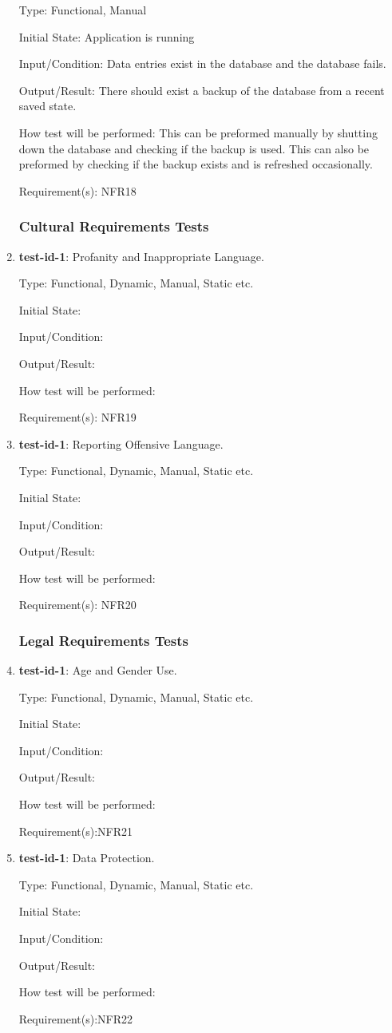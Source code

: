\documentclass[12pt, titlepage]{article}
\begin{document}
\begin{enumerate}
		Type: Functional, Manual
		
		Initial State: Application is running
		
		Input/Condition: Data entries exist in the database and the database fails.
		
		Output/Result: There should exist a backup of the database from a recent saved state.
		
		How test will be performed: This can be preformed manually by shutting down the database and checking if the backup is used. This can also be preformed by checking if the backup exists and is refreshed occasionally.
		
		Requirement(s): NFR18
	\subsubsection{Cultural Requirements Tests}
		\item{\textbf{test-id-1}}: Profanity and Inappropriate Language.
		
		Type: Functional, Dynamic, Manual, Static etc.
		
		Initial State: 
		
		Input/Condition: 
		
		Output/Result: 
		
		How test will be performed: 
		
		Requirement(s): NFR19
		
		\item{\textbf{test-id-1}}: Reporting Offensive Language.
		
		Type: Functional, Dynamic, Manual, Static etc.
		
		Initial State: 
		
		Input/Condition: 
		
		Output/Result: 
		
		How test will be performed: 
		
		Requirement(s): NFR20
	\subsubsection{Legal Requirements Tests}
		\item{\textbf{test-id-1}}: Age and Gender Use.
		
		Type: Functional, Dynamic, Manual, Static etc.
		
		Initial State: 
		
		Input/Condition: 
		
		Output/Result: 
		
		How test will be performed: 
		
		Requirement(s):NFR21
		\item{\textbf{test-id-1}}: Data Protection.
		
		Type: Functional, Dynamic, Manual, Static etc.
		
		Initial State: 
		
		Input/Condition: 
		
		Output/Result: 
		
		How test will be performed: 
		
		Requirement(s):NFR22
	\end{enumerate}
\end{document}
